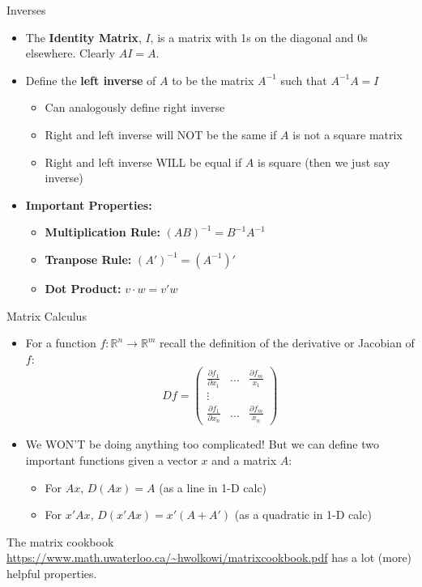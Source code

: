 \documentclass[aspectratio=169,11pt]{beamer}
\begin{document}
\begin{frame}{Inverses}
\begin{itemize}
	\item The {\bf Identity Matrix}, $I$, is a matrix with 1s on the diagonal and 0s elsewhere. Clearly $AI = A$.
	\item Define the {\bf left inverse} of $A$ to be the matrix $A^{-1}$ such that $A^{-1}A=I$
	\begin{itemize}
		\item Can analogously define right inverse
		\item Right and left inverse will NOT be the same if $A$ is not a square matrix
		\item Right and left inverse WILL be equal if $A$ is square (then we just say inverse)
	\end{itemize}
	\item {\bf Important Properties:}
		\begin{itemize}
			\item {\bf Multiplication Rule:} $(AB)^{-1} = B^{-1}A^{-1}$
			\item {\bf Tranpose Rule:} $(A')^{-1} = (A^{-1})'$
			\item {\bf Dot Product:} $v\cdot w = v'w$
		\end{itemize}
\end{itemize}

\end{frame}

\begin{frame}{Matrix Calculus}
	\begin{itemize}
		\item For a function $f:\mathbb{R}^n\to\mathbb{R}^m$ recall the definition of the derivative or Jacobian of $f$:
			\[
				Df = \left(\begin{array}{ccc}
					\frac{\partial f_1}{\partial x_1} & \dots & \frac{\partial f_m}{x_1}\\
					\vdots & & \\
					\frac{\partial f_1}{\partial x_n} & \dots & \frac{\partial f_m}{x_n}
					 \end{array}\right)
			\]
		\item We WON'T be doing anything too complicated! But we can define two important functions given a vector $x$ and a matrix $A$:
		\begin{itemize}
			\item For $Ax$, $D(Ax) = A$ (as a line in 1-D calc)
			\item For $x'Ax$, $D(x'Ax) = x'(A+A')$ (as a quadratic in 1-D calc)
		\end{itemize}
	\end{itemize}
	The matrix cookbook \url{https://www.math.uwaterloo.ca/~hwolkowi/matrixcookbook.pdf} has a lot (more) helpful properties.
\end{frame}
\end{document}
